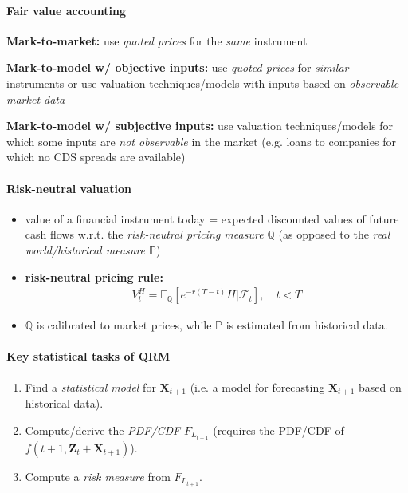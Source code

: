 \documentclass[a4paper,landscape,8pt,fleqn]{scrartcl}
\renewcommand{\emph}[1]{\textbf{#1}}
\begin{document}
\begin{multicols*}{3}
\paragraph{Fair value accounting}
\begin{description}[style=multiline,leftmargin=1.1cm,font=\textbf]
\item[Level 1] \emph{Mark-to-market:} use \textit{quoted prices} for the \textit{same} instrument
\item[Level 2] \emph{Mark-to-model w/ objective inputs:} use \textit{quoted prices} for \textit{similar} instruments or use valuation techniques/models with inputs based on \textit{observable market data}
\item[Level 3] \emph{Mark-to-model w/ subjective inputs:} use valuation techniques/models for which some inputs are \textit{not observable} in the market (e.g. loans to companies for which no CDS spreads are available)
\end{description}

\paragraph{Risk-neutral valuation}
\begin{itemize}
\item value of a financial instrument today = expected discounted values of future cash flows w.r.t. the \textit{risk-neutral pricing measure $\mathbb{Q}$} (as opposed to the \textit{real world/historical measure $\mathbb{P}$})
\item \emph{risk-neutral pricing rule:}
\begin{align*}
V_t^H = \mathbb{E}_\mathbb{Q} [e^{-r(T-t)} H | \mathcal{F}_t], \quad t < T
\end{align*}
\item $\mathbb{Q}$ is calibrated to market prices, while $\mathbb{P}$ is estimated from historical data.
\end{itemize}

\paragraph{Key statistical tasks of QRM}
\begin{enumerate}
\item Find a \textit{statistical model} for $\bm X_{t+1}$ (i.e. a model for forecasting $\bm X_{t+1}$ based on historical data).
\item Compute/derive the \textit{PDF/CDF} $F_{L_{t+1}}$ (requires the PDF/CDF of $f(t+1, \bm Z_t + \bm X_{t+1})$).
\item Compute a \textit{risk measure} from $F_{L_{t+1}}$.
\end{enumerate}


\end{multicols*}
\end{document}
